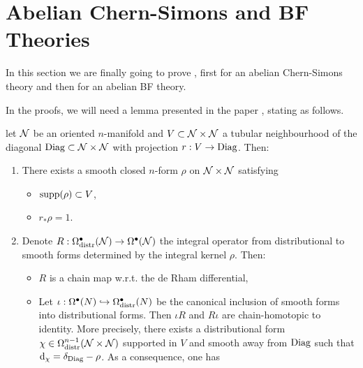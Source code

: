 \section{Abelian Chern-Simons and BF Theories}
\label{sec:abelain_chern_simons_BF_theories}

In this section we are finally going to prove , first for an abelian Chern-Simons theory and then for an abelian BF theory.

In the proofs, we will need a lemma presented in the paper \cite{Gluing_BV-BFV}, stating as follows.

\begin{lemma}
\label{lemma:tubular_neighbourhood}
    let $\mathcal{N}$ be an oriented $n$-manifold and $V \subset \mathcal{N} \times \mathcal{N}$ a tubular neighbourhood of the diagonal $\text{\normalfont Diag} \subset \mathcal{N} \times \mathcal{N}$ with projection $r: V \rightarrow \text{\normalfont Diag}$.
    Then:
    \begin{enumerate}[label={\normalfont \alph*)}]
        \item \label{enum:tubular_a} There exists a smooth closed $n$-form $\rho$ on $\mathcal{N} \times \mathcal{N}$ satisfying
        \begin{itemize}[label= $\diamond$]
            \item $\text{\normalfont supp}(\rho) \subset V$,
            \item $r_* \rho = 1$.
        \end{itemize}
        \item \label{enum:tubular_b} Denote $R: \Omega^\bullet_{\text{\normalfont distr}} (\mathcal{N}) \rightarrow \Omega^\bullet (\mathcal{N})$ the integral operator from distributional to smooth forms determined by the integral kernel $\rho$.
        Then:
        \begin{itemize}[label= $\diamond$]
            \item $R$ is a chain map w.r.t. the de Rham differential,
            \item Let $\iota: \Omega^\bullet (N) \hookrightarrow \Omega^\bullet_{\text{\normalfont distr}} (N)$ be the canonical inclusion of smooth forms into distributional forms.
            Then $\iota R$ and $R \iota$ are chain-homotopic to identity.
            More precisely, there exists a distributional form $\chi \in \Omega_{\text{\normalfont distr}}^{n-1} (\mathcal{N} \times \mathcal{N})$ supported in $V$ and smooth away from $\text{\normalfont Diag}$ such that $\dd_\chi = \delta_{\text{\normalfont Diag}} - \rho$.
            As a consequence, one has
            \begin{equation}
            \label{eq:chain_homotopy_lemma}
                \begin{aligned}

\end{aligned}
\end{equation}
\end{itemize}
\end{enumerate}
\end{lemma}
